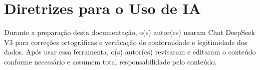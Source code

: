 \documentclass[11pt]{article}
\begin{document}
\section{Diretrizes para o Uso de IA}

Durante a preparação desta documentação, o(s) autor(es) usaram Chat DeepSeek V3 para correções ortográficas e verificação de conformidade e legitimidade dos dados. Após usar essa ferramenta, o(s) autor(es) revisaram e editaram o conteúdo conforme necessário e assumem total responsabilidade pelo conteúdo.

% 
% 
\end{document}
